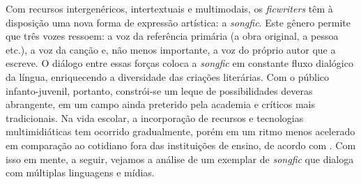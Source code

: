 Com recursos intergenéricos, intertextuais e multimodais, os
\emph{ficwriters} têm à disposição uma nova forma de expressão
artística: a \emph{songfic}. Este gênero permite que três vozes ressoem:
a voz da referência primária (a obra original, a pessoa etc.), a voz da
canção e, não menos importante, a voz do próprio autor que a escreve. O
diálogo entre essas forças coloca a \emph{songfic} em constante fluxo
dialógico da língua, enriquecendo a diversidade das criações literárias.
Com o público infanto-juvenil, portanto, constrói-se um leque de
possibilidades deveras abrangente, em um campo ainda preterido pela
academia e críticos mais tradicionais. Na vida escolar, a incorporação
de recursos e tecnologias multimidiáticas tem ocorrido gradualmente,
porém em um ritmo menos acelerado em comparação ao cotidiano fora das
instituições de ensino, de acordo com \textcite{damiani2016}. Com isso em mente,
a seguir, vejamos a análise de um exemplar de \emph{songfic} que dialoga
com múltiplas linguagens e mídias.